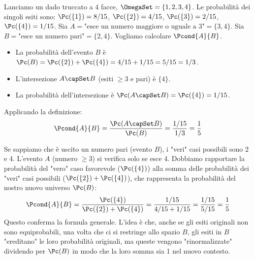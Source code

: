 \begin{example}
Lanciamo un dado truccato a 4 facce, $\OmegaSet = \{1, 2, 3, 4\}$.
Le probabilità dei singoli esiti sono:
$\Pc(\{1\}) = 8/15$, $\Pc(\{2\}) = 4/15$, $\Pc(\{3\}) = 2/15$, $\Pc(\{4\}) = 1/15$.
Sia $A = \text{"esce un numero maggiore o uguale a 3"} = \{3, 4\}$.
Sia $B = \text{"esce un numero pari"} = \{2, 4\}$.
Vogliamo calcolare $\Pcond{A}{B}$.

\begin{itemize}
    \item La probabilità dell'evento $B$ è $\Pc(B) = \Pc(\{2\}) + \Pc(\{4\}) = 4/15 + 1/15 = 5/15 = 1/3$.
    \item L'intersezione $A \capSet B$ (esiti $\ge 3$ e pari) è $\{4\}$.
    \item La probabilità dell'intersezione è $\Pc(A \capSet B) = \Pc(\{4\}) = 1/15$.
\end{itemize}
Applicando la definizione:
\[ \Pcond{A}{B} = \frac{\Pc(A \capSet B)}{\Pc(B)} = \frac{1/15}{1/3} = \frac{1}{5} \]
\begin{remark}
Se sappiamo che è uscito un numero pari (evento $B$), i "veri" casi possibili sono 2 e 4. L'evento $A$ (numero $\ge 3$) si verifica solo se esce 4. Dobbiamo rapportare la probabilità del "vero" caso favorevole ($\Pc(\{4\})$) alla somma delle probabilità dei "veri" casi possibili ($\Pc(\{2\}) + \Pc(\{4\})$), che rappresenta la probabilità del nostro nuovo universo $\Pc(B)$:
\[ \Pcond{A}{B} = \frac{\Pc(\{4\})}{\Pc(\{2\}) + \Pc(\{4\})} = \frac{1/15}{4/15 + 1/15} = \frac{1/15}{5/15} = \frac{1}{5} \]
Questo conferma la formula generale. L'idea è che, anche se gli esiti originali non sono equiprobabili, una volta che ci si restringe allo spazio $B$, gli esiti in $B$ "ereditano" le loro probabilità originali, ma queste vengono "rinormalizzate" dividendo per $\Pc(B)$ in modo che la loro somma sia 1 nel nuovo contesto.
\end{remark}
\end{example}

